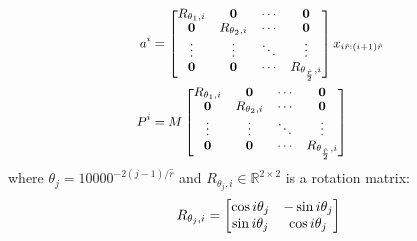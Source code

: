 \documentclass[11pt]{article}
\begin{document}
\begin{equation}
  \small
\begin{split}
  a^i &=  \begin{bmatrix}
  {R}_{\theta_1, i} & \mathbf{0} & \cdots & \mathbf{0} \\
\mathbf{0} &   {R}_{\theta_2, i} & \cdots & \mathbf{0} \\
\vdots & \vdots & \ddots & \vdots \\
\mathbf{0} & \mathbf{0} & \cdots & {R}_{\theta_\frac{\hat{r}}{2}, i}
\end{bmatrix} x_{i\hat{r}: (i+1)\hat{r}}\\
  P^i &= M \begin{bmatrix}
  {R}_{\theta_1, i} & \mathbf{0} & \cdots & \mathbf{0} \\
\mathbf{0} &   {R}_{\theta_2, i} & \cdots & \mathbf{0} \\
\vdots & \vdots & \ddots & \vdots \\
\mathbf{0} & \mathbf{0} & \cdots & {R}_{\theta_\frac{\hat{r}}{2}, i}
\end{bmatrix}
\end{split}
\end{equation}
where $\theta_j=10000^{-2(j-1) / \hat{r}}$ and ${R}_{\theta_j,i} \in \mathbb{R}^{2\times2}$ is a rotation matrix:
\begin{equation}
 {R}_{\theta_j, i}=\begin{bmatrix}
\cos i \theta_j & -\sin i \theta_j \\
\sin i \theta_j & \cos i \theta_j
\end{bmatrix}\\
\end{equation}
\end{document}
